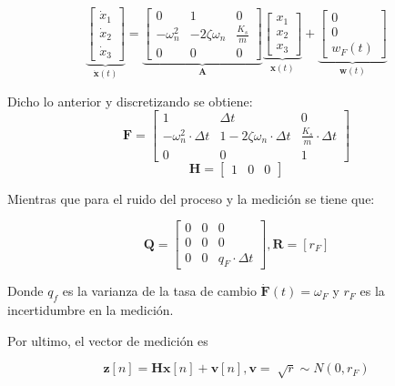 \documentclass[conference]{IEEEtran}
\begin{document}
\begin{equation*}
	\underbrace{
		\begin{bmatrix}
			\dot{x}_1 \\
			\dot{x}_2 \\
			\dot{x}_3
		\end{bmatrix}
	}_{\mathbf{\dot{x}}(t)}
	=
	\underbrace{\begin{bmatrix}
			0           & 1                & 0 \\
			-\omega_n^2 & -2\zeta\omega_n  &  \frac{K_s}{m} \\
			0			& 0				   & 0
	\end{bmatrix}}_{\mathbf{A}}
	\underbrace{\begin{bmatrix}
			x_1 \\
			x_2 \\
			x_3
	\end{bmatrix}}_{\mathbf{x}(t)}	
	+
	\underbrace{
	\begin{bmatrix}
		0 \\
		0 \\
		w_{F}(t)
	\end{bmatrix}
	}_{\mathbf{w}(t)}	
\end{equation*}

Dicho lo anterior y discretizando se obtiene:
\[
\mathbf{F} = 
\begin{bmatrix}
	1           & \Delta t            & 0 \\
	-\omega_n^2 \cdot \Delta t   & 1 -2\zeta\omega_n \cdot \Delta t   &  \frac{K_s}{m} \cdot \Delta t  \\
	0			& 0				   & 1
\end{bmatrix}
\]
\[
\mathbf{H} = 
\begin{bmatrix}
	1 & 0 & 0
\end{bmatrix}
\]


Mientras que para el ruido del proceso y la medición se tiene que:


\[
\mathbf{Q} =  \begin{bmatrix}
	0   & 0    & 0 \\
	0   & 0    & 0  \\
	0   & 0	   & q_F \cdot \Delta t
\end{bmatrix}, \mathbf{R} = [r_F]
\]

Donde $q_f$ es la varianza de la tasa de cambio $\mathbf{\dot{F}}(t) = \omega_{F}$ y $r_F$ es la incertidumbre en la medici\'on.

Por ultimo, el vector de medición es

\[
\textbf{z}[n] = \textbf{H} \textbf{x}[n] + \textbf{v}[n] ,
\mathbf{v} = \sqrt[]{r} \sim {N} {(0,r_{F})}
\]
\end{document}
